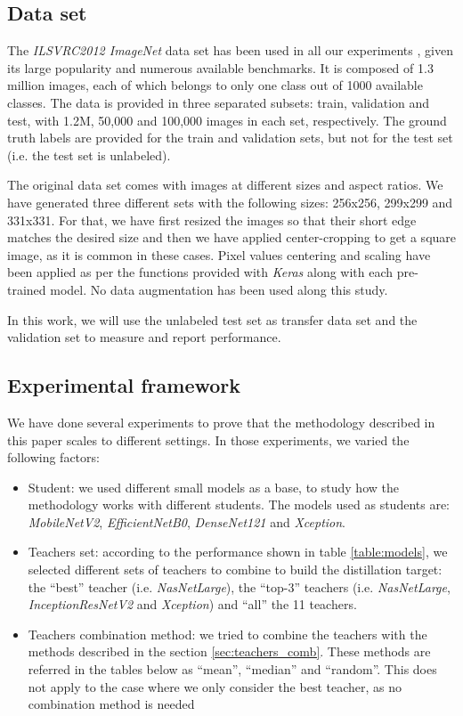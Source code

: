 \documentclass{elsarticle}
\begin{document}
	\subsection{Data set}
	The \textit{ILSVRC2012 ImageNet} data set has been used in all our experiments \citep{ILSVRC15}, given its large popularity and numerous available benchmarks. It is composed of 1.3 million images,  each of which belongs to only one class out of 1000 available classes. The data is provided in three separated subsets: train, validation and test, with 1.2M, 50,000 and 100,000 images in each set, respectively. The ground truth labels are provided for the train and validation sets, but not for the test set (i.e. the test set is unlabeled).

	The original data set comes with images at different sizes and aspect ratios. We have generated three different sets with the following sizes: 256x256, 299x299 and 331x331. For that, we have first resized the images so that their short edge matches the desired size and then we have applied center-cropping to get a square image, as it is common in these cases. Pixel values centering and scaling have been applied as per the functions provided with \textit{Keras} along with each pre-trained model. No data augmentation has been used along this study.

	In this work, we will use the unlabeled test set as transfer data set and the validation set to measure and report performance.

	\subsection{Experimental framework}
	We have done several experiments to prove that the methodology described in this paper scales to different settings. In those experiments, we varied the following factors:

	\begin{itemize}
		\item Student: we used different small models as a base, to study how the methodology works with different students. The models used as students are: \textit{MobileNetV2}, \textit{EfficientNetB0}, \textit{DenseNet121} and \textit{Xception}.
		\item Teachers set: according to the performance shown in table \ref{table:models}, we selected different sets of teachers to combine to build the distillation target: the ``best'' teacher (i.e. \textit{NasNetLarge}), the ``top-3'' teachers (i.e. \textit{NasNetLarge}, \textit{InceptionResNetV2} and \textit{Xception}) and ``all'' the 11 teachers.
		\item Teachers combination method: we tried to combine the teachers with the methods described in the section \ref{sec:teachers_comb}. These methods are referred in the tables below as ``mean'', ``median'' and ``random''. This does not apply to the case where we only consider the best teacher, as no combination method is needed
	\end{itemize}
\end{document}
